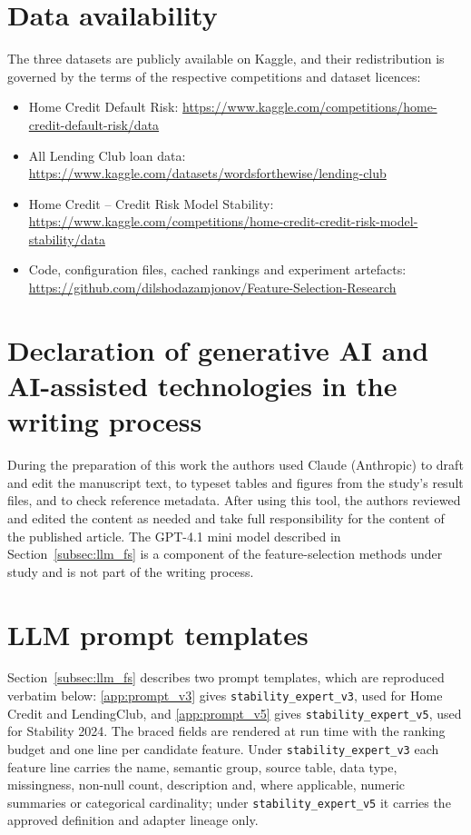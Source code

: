 \documentclass[final,5p,twocolumn]{elsarticle}
\begin{document}
\section*{Data availability}
The three datasets are publicly available on Kaggle, and their redistribution is governed by the terms of the respective competitions and dataset licences:
\begin{itemize}
    \item Home Credit Default Risk: \url{https://www.kaggle.com/competitions/home-credit-default-risk/data}
    \item All Lending Club loan data: \url{https://www.kaggle.com/datasets/wordsforthewise/lending-club}
    \item Home Credit -- Credit Risk Model Stability: \url{https://www.kaggle.com/competitions/home-credit-credit-risk-model-stability/data}
    \item Code, configuration files, cached rankings and experiment artefacts: \url{https://github.com/dilshodazamjonov/Feature-Selection-Research}
\end{itemize}

\section*{Declaration of generative AI and AI-assisted technologies in the writing process}
During the preparation of this work the authors used Claude (Anthropic) to draft and edit the manuscript text, to typeset tables and figures from the study's result files, and to check reference metadata. After using this tool, the authors reviewed and edited the content as needed and take full responsibility for the content of the published article. The GPT-4.1 mini model described in Section~\ref{subsec:llm_fs} is a component of the feature-selection methods under study and is not part of the writing process.

\appendix
\section{LLM prompt templates}
\label{app:prompts}

Section~\ref{subsec:llm_fs} describes two prompt templates, which are reproduced verbatim below: \ref{app:prompt_v3} gives \texttt{stability\_\allowbreak expert\_\allowbreak v3}, used for Home Credit and LendingClub, and \ref{app:prompt_v5} gives \texttt{stability\_\allowbreak expert\_\allowbreak v5}, used for Stability 2024. The braced fields are rendered at run time with the ranking budget and one line per candidate feature. Under \texttt{stability\_\allowbreak expert\_\allowbreak v3} each feature line carries the name, semantic group, source table, data type, missingness, non-null count, description and, where applicable, numeric summaries or categorical cardinality; under \texttt{stability\_\allowbreak expert\_\allowbreak v5} it carries the approved definition and adapter lineage only.
\end{document}
